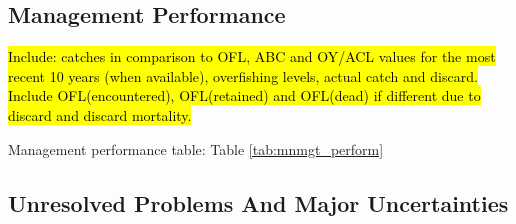 \documentclass[12pt,]{article}
\begin{document}
\FloatBarrier

\subsection*{Management Performance}\label{management-performance}

\hl{Include: catches in comparison to OFL, ABC and OY/ACL values for the most 
recent 10 years (when available), overfishing levels, actual catch and discard. 
Include OFL(encountered), OFL(retained) and OFL(dead) if different due to discard 
and discard mortality.}

Management performance table: Table \ref{tab:mnmgt_perform}

\begin{table}[ht]
\centering
\caption{Recent trend in total catch and commercial 
                              landings (mt) relative to the management guidelines. 
                              Estimated total catch reflect the commercial landings 
                              plus the model estimated discarded biomass.} 
\label{tab:mnmgt_perform}
\end{table}

\subsection*{Unresolved Problems And Major
Uncertainties}\label{unresolved-problems-and-major-uncertainties}
\end{document}

